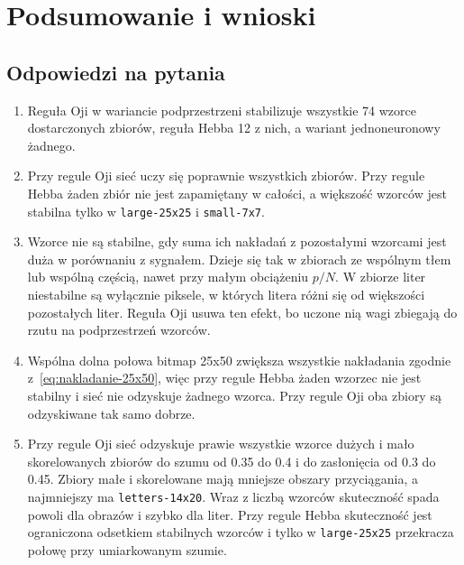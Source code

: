 \section{Podsumowanie i wnioski}
\label{sec:podsumowanie}

\subsection{Odpowiedzi na pytania}
\label{sec:odpowiedzi}

\begin{enumerate}
    \item {}
    Reguła Oji w wariancie podprzestrzeni stabilizuje wszystkie 74 wzorce dostarczonych zbiorów, reguła Hebba 12 z nich, a wariant jednoneuronowy żadnego.
    \item {}
    Przy regule Oji sieć uczy się poprawnie wszystkich zbiorów. Przy regule Hebba żaden zbiór nie jest zapamiętany w całości, a większość wzorców jest stabilna tylko w \texttt{large-25x25} i \texttt{small-7x7}.
    \item {}
    Wzorce nie są stabilne, gdy suma ich nakładań z pozostałymi wzorcami jest duża w porównaniu z sygnałem. Dzieje się tak w zbiorach ze wspólnym tłem lub wspólną częścią, nawet przy małym obciążeniu $p/N$. W zbiorze liter niestabilne są wyłącznie piksele, w których litera różni się od większości pozostałych liter. Reguła Oji usuwa ten efekt, bo uczone nią wagi zbiegają do rzutu na podprzestrzeń wzorców.
    \item {}
    Wspólna dolna połowa bitmap \mbox{25x50} zwiększa wszystkie nakładania zgodnie z~\eqref{eq:nakladanie-25x50}, więc przy regule Hebba żaden wzorzec nie jest stabilny i sieć nie odzyskuje żadnego wzorca. Przy regule Oji oba zbiory są odzyskiwane tak samo dobrze.
    \item {}
    Przy regule Oji sieć odzyskuje prawie wszystkie wzorce dużych i mało skorelowanych zbiorów do szumu od \num{0.35} do \num{0.4} i do zasłonięcia od \num{0.3} do \num{0.45}. Zbiory małe i skorelowane mają mniejsze obszary przyciągania, a najmniejszy ma \texttt{letters-14x20}. Wraz z liczbą wzorców skuteczność spada powoli dla obrazów i szybko dla liter. Przy regule Hebba skuteczność jest ograniczona odsetkiem stabilnych wzorców i tylko w \texttt{large-25x25} przekracza połowę przy umiarkowanym szumie.

\end{enumerate}
